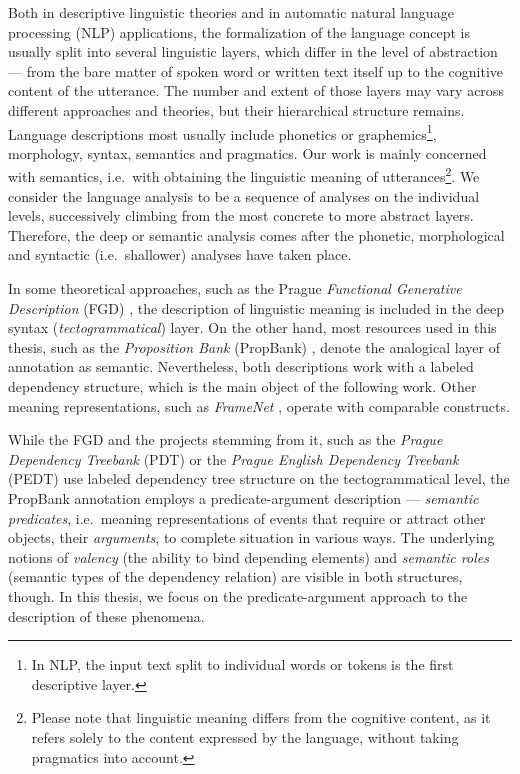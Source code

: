\documentclass[12pt,notitlepage]{report}
\begin{document}
Both in descriptive linguistic theories and in automatic natural language processing (NLP) applications, the formalization of the language concept is usually split into several linguistic layers, which differ in the level of abstraction --- from the bare matter of spoken word or written text itself up to the cognitive content of the utterance. The number and extent of those layers may vary across different approaches and theories, but their hierarchical structure remains. Language descriptions most usually include phonetics or graphemics\footnote{In NLP, the input text split to individual words or tokens is the first descriptive layer.}, morphology, syntax, semantics and pragmatics. Our work is mainly concerned with semantics, i.e.\ with obtaining the linguistic meaning \citep[p. 35ff.]{sgall86} of utterances\footnote{Please note that linguistic meaning differs from the cognitive content, as it refers solely to the content expressed by the language, without taking pragmatics into account.}. We consider the language analysis to be a sequence of analyses on the individual levels, successively climbing from the most concrete to more abstract layers. Therefore, the deep or semantic analysis comes after the phonetic, morphological and syntactic (i.e.\ shallower) analyses have taken place.

In some theoretical approaches, such as the Prague \emph{Functional Generative Description} (FGD) \citep{sgall86}, the description of linguistic meaning is included in the deep syntax (\emph{tectogrammatical}) layer. On the other hand, most resources used in this thesis, such as the \emph{Proposition Bank} (PropBank) \linebreak[4] \citep{palmer05}, denote the analogical layer of annotation as semantic. Nevertheless, both descriptions work with a labeled dependency structure, which is the main object of the following work. Other meaning representations, such as \emph{Frame\-Net} \citep{baker98}, operate with comparable constructs.

While the FGD and the projects stemming from it, such as the \emph{Prague Dependency Treebank} (PDT) \citep{hajic06} or the \emph{Prague English Dependency Treebank} (PEDT) \citep{cinkova09} use labeled dependency tree structure on the tectogrammatical level, the PropBank annotation \citep{kingsbury03} employs a predicate-argument description --- \emph{semantic predicates}, i.e.\ meaning representations of events that require or attract other objects, their \emph{arguments}, to complete situation in various ways. The underlying notions of \emph{valency} (the ability to bind depending elements) and \emph{semantic roles} \citep[cf. e.g.][p. 123]{gildea02,carreras05,sgall86} (semantic types of the dependency relation) are visible in both structures, though. In this thesis, we focus on the predicate-argument approach to the description of these phenomena.
\end{document}
